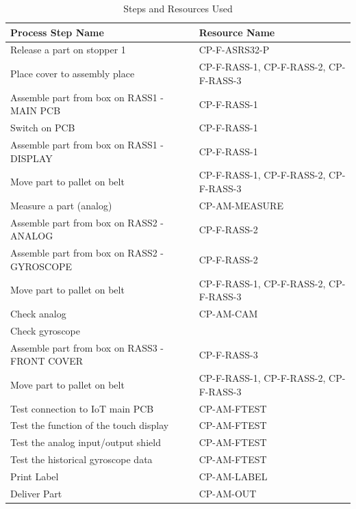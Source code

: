 \begin{table}[H]
  \centering
  \caption{Steps and Resources Used}
  \label{tab:description-resources}
  \begin{tabular}{@{}p{}p{}@{}}
    \toprule
    \textbf{Process Step Name}                    & \textbf{Resource Name}                \\
    \midrule
    Release a part on stopper 1                   & CP-F-ASRS32-P                         \\
    Place cover to assembly place                 & CP-F-RASS-1, CP-F-RASS-2, CP-F-RASS-3 \\
    Assemble part from box on RASS1 - MAIN PCB    & CP-F-RASS-1                           \\
    Switch on PCB                                 & CP-F-RASS-1                           \\
    Assemble part from box on RASS1 - DISPLAY     & CP-F-RASS-1                           \\
    Move part to pallet on belt                   & CP-F-RASS-1, CP-F-RASS-2, CP-F-RASS-3 \\
    Measure a part (analog)                       & CP-AM-MEASURE                         \\
    Assemble part from box on RASS2 - ANALOG      & CP-F-RASS-2                           \\
    Assemble part from box on RASS2 - GYROSCOPE   & CP-F-RASS-2                           \\
    Move part to pallet on belt                   & CP-F-RASS-1, CP-F-RASS-2, CP-F-RASS-3 \\
    Check analog                                  & CP-AM-CAM                             \\
    Check gyroscope                               &                                       \\
    Assemble part from box on RASS3 - FRONT COVER & CP-F-RASS-3                           \\
    Move part to pallet on belt                   & CP-F-RASS-1, CP-F-RASS-2, CP-F-RASS-3 \\
    Test connection to IoT main PCB               & CP-AM-FTEST                           \\
    Test the function of the touch display        & CP-AM-FTEST                           \\
    Test the analog input/output shield           & CP-AM-FTEST                           \\
    Test the historical gyroscope data            & CP-AM-FTEST                           \\
    Print Label                                   & CP-AM-LABEL                           \\
    Deliver Part                                  & CP-AM-OUT                             \\
    \bottomrule
  \end{tabular}
\end{table}


